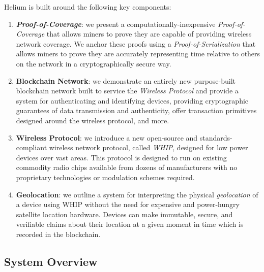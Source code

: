 \documentclass[10pt, nonatbib, nocopyrightspace, reprint]{sigplanconf}
\begin{document}
Helium is built around the following key components:

\begin{enumerate}
  \item \textbf{\emph{Proof-of-Coverage}}: we present a computationally-inexpensive \emph{Proof-of-Coverage} that allows miners to prove they are capable of providing wireless network coverage. We anchor these proofs using a \emph{Proof-of-Serialization} that allows miners to prove they are accurately representing time relative to others on the network in a cryptographically secure way.

  \item \textbf{Blockchain Network}: we demonstrate an entirely new purpose-built blockchain network built to service the \emph{Wireless Protocol} and provide a system for authenticating and identifying devices, providing cryptographic guarantees of data transmission and authenticity, offer transaction primitives designed around the wireless protocol, and more.

    \item \textbf{Wireless Protocol}: we introduce a new open-source and standards-compliant wireless network protocol, called \emph{WHIP}, designed for low power devices over vast areas. This protocol is designed to run on existing commodity radio chips available from dozens of manufacturers with no proprietary technologies or modulation schemes required.

    \item \textbf{Geolocation}: we outline a system for interpreting the physical \emph{geolocation} of a device using WHIP without the need for expensive and power-hungry satellite location hardware. Devices can make immutable, secure, and verifiable claims about their location at a given moment in time which is recorded in the blockchain.
\end{enumerate}

\subsection{System Overview}
\end{document}
